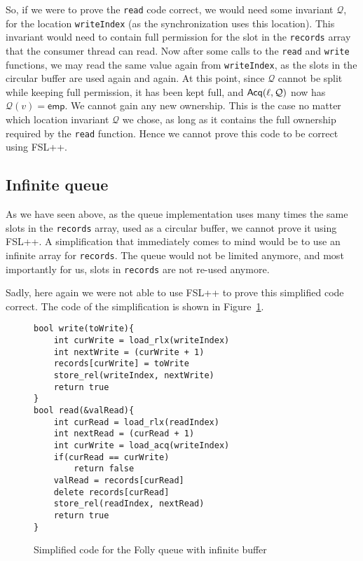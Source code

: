 So, if we were to prove the \texttt{read} code correct, we would need some invariant $\mathcal{Q}$, for the location \texttt{writeIndex} (as the synchronization uses this location). This invariant would need to contain full permission for the slot in the \texttt{records} array that the consumer thread can read. Now after some calls to the \texttt{read} and \texttt{write} functions, we may read the same value again from \texttt{writeIndex}, as the slots in the circular buffer are used again and again. At this point, since $\mathcal{Q}$ cannot be split while keeping full permission, it has been kept full, and $\operatorname{\mathsf{Acq}}(\ell, \mathcal{Q})$ now has $\mathcal{Q}(v) = \mathsf{emp}$. We cannot gain any new ownership. This is the case no matter which location invariant $\mathcal{Q}$ we chose, as long as it contains the full ownership required by the \texttt{read} function. Hence we cannot prove this code to be correct using FSL++.

\subsection{Infinite queue}
As we have seen above, as the queue implementation uses many times the same slots in the \texttt{records} array, used as a circular buffer, we cannot prove it using FSL++. A simplification that immediately comes to mind would be to use an infinite array for \texttt{records}. The queue would not be limited anymore, and most importantly for us, slots in \texttt{records} are not re-used anymore.

Sadly, here again we were not able to use FSL++ to prove this simplified code correct. The code of the simplification is shown in Figure~\ref{fig:queueCode}. 

\begin{figure}
\begin{lstlisting}
bool write(toWrite){
	int curWrite = load_rlx(writeIndex)
	int nextWrite = (curWrite + 1)
	records[curWrite] = toWrite
	store_rel(writeIndex, nextWrite)
	return true
}
bool read(&valRead){
	int curRead = load_rlx(readIndex)
	int nextRead = (curRead + 1)
	int curWrite = load_acq(writeIndex)
	if(curRead == curWrite)
		return false
	valRead = records[curRead]
	delete records[curRead]
	store_rel(readIndex, nextRead)
	return true
}

\end{lstlisting}
		\caption{Simplified code for the Folly queue with infinite buffer}
		\label{fig:queueCode}
\end{figure}



